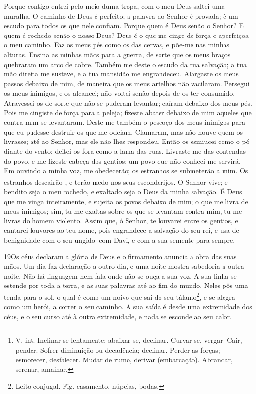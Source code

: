 Porque contigo entrei pelo meio duma tropa, com o meu Deus saltei
uma muralha. O caminho de Deus é perfeito; a palavra do
Senhor é provada; é um escudo para todos os que nele confiam.
Porque quem é Deus senão o Senhor? E quem é rochedo senão o
nosso Deus? Deus é o que me cinge de força e aperfeiçoa o meu
caminho. Faz os meus pés como os das cervas, e põe-me nas
minhas alturas. Ensina as minhas mãos para a guerra, de sorte
que os meus braços quebraram um arco de cobre. Também me
deste o escudo da tua salvação; a tua mão direita me susteve, e a
tua mansidão me engrandeceu. Alargaste os meus passos debaixo
de mim, de maneira que os meus artelhos não vacilaram.
Persegui os meus inimigos, e os alcancei; não voltei senão
depois de os ter consumido. Atravessei-os de sorte que não se
puderam levantar; caíram debaixo dos meus pés. Pois me
cingiste de força para a peleja; fizeste abater debaixo de mim
aqueles que contra mim se levantaram. Deste-me também o
pescoço dos meus inimigos para que eu pudesse destruir os que me
odeiam. Clamaram, mas não houve quem os livrasse; até ao
Senhor, mas ele não lhes respondeu. Então os esmiucei como o
pó diante do vento; deitei-os fora como a lama das ruas.
Livraste-me das contendas do povo, e me fizeste cabeça dos
gentios; um povo que não conheci me servirá. Em ouvindo a
minha voz, me obedecerão; os estranhos se submeterão a mim.
Os estranhos descairão\footnote{V. int. Inclinar-se
lentamente; abaixar-se, declinar. Curvar-se, vergar. Cair, pender.
Sofrer diminuição ou decadência; declinar. Perder as forças;
esmorecer, desfalecer. Mudar de rumo, derivar (embarcação).
Abrandar, serenar, amainar.}, e terão medo nos seus esconderijos.
O Senhor vive; e bendito seja o meu rochedo, e exaltado seja
o Deus da minha salvação. É Deus que me vinga inteiramente, e
sujeita os povos debaixo de mim; o que me livra de meus
inimigos; sim, tu me exaltas sobre os que se levantam contra mim, tu
me livras do homem violento. Assim que, ó Senhor, te louvarei
entre os gentios, e cantarei louvores ao teu nome, pois
engrandece a salvação do seu rei, e usa de benignidade com o seu
ungido, com Davi, e com a sua semente para sempre.

\bigskip

\lettrine{19}{}Os céus declaram a glória de Deus e o firmamento
anuncia a obra das suas mãos. Um dia faz declaração a outro dia,
e uma noite mostra sabedoria a outra noite. Não há linguagem nem
fala onde não se ouça a sua voz. A sua linha se estende por toda
a terra, e as suas palavras até ao fim do mundo. Neles pôs uma tenda
para o sol, o qual é como um noivo que sai do seu
tálamo\footnote{Leito conjugal. Fig. casamento, núpcias, bodas.}, e
se alegra como um herói, a correr o seu caminho. A sua saída é
desde uma extremidade dos céus, e o seu curso até à outra
extremidade, e nada se esconde ao seu calor.

